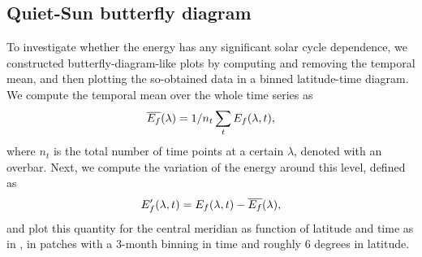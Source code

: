 \documentclass{aa}
\begin{document}
\subsection{Quiet-Sun \fff butterfly diagram}\label{qsf}

To investigate whether the \fff energy has any significant solar cycle dependence, we constructed butterfly-diagram-like plots by computing and removing the temporal mean, and then plotting the so-obtained data in a binned latitude-time diagram. 
We compute the temporal mean over the whole time series as 
\begin{equation}
    \overline{E_f}(\lambda) = 1/n_t \sum_t E_f(\lambda,t),
\end{equation}
where $n_t$ is the total number of time points at a certain $\lambda$,  denoted with an overbar. Next, we compute the variation of the \fff energy around this level, defined as
\begin{equation}
    E_f'(\lambda,t)=E_f(\lambda,t)-\overline{E_f}(\lambda),
\end{equation}
and plot this quantity
for the central meridian
as function of latitude and time as in , 
in patches 
with a 3-month binning in time and roughly 6 degrees in latitude. 
\end{document}
